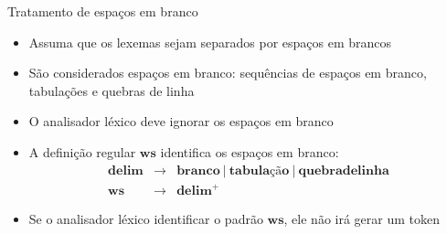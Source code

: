 \begin{frame}[fragile]{Tratamento de espaços em branco}

    \begin{itemize}
        \item Assuma que os lexemas sejam separados por espaços em brancos
        \pause

        \item São considerados espaços em branco: sequências de espaços em branco, tabulações e quebras de linha
        \pause

        \item O analisador léxico deve ignorar os espaços em branco
        \pause

        \item A definição regular $\mathbf{ws}$ identifica os espaços em branco:
        \[
            \begin{array}{rcl}
                \mathbf{delim} & \to & \mathbf{branco}\ |\ \mathbf{tabulação}\ |\ \mathbf{quebra de linha}\\
                \mathbf{ws} & \to & \mathbf{delim}^+
            \end{array}
        \]
        \pause

        \item Se o analisador léxico identificar o padrão $\mathbf{ws}$, ele não irá gerar um token
    \end{itemize}

\end{frame}

